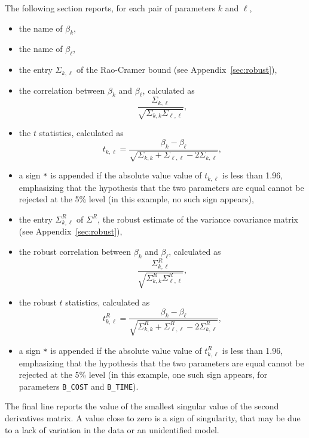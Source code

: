 \documentclass[12pt,a4paper]{article}
\begin{document}
The following section reports, for each pair of parameters $k$ and
$\ell$,
\begin{itemize}
\item the name of $\beta_k$,
\item the name of $\beta_\ell$,
\item the entry $\Sigma_{k,\ell}$ of the 
         Rao-Cramer bound (see Appendix~\ref{sec:robust}),
\item the correlation between $\beta_k$ and $\beta_\ell$, calculated as
\begin{equation}
\frac{\Sigma_{k,\ell}}{\sqrt{\Sigma_{k,k}\Sigma_{\ell,\ell}}},
\end{equation}
\item the $t$ statistics, calculated as
\begin{equation}
t_{k,\ell}= \frac{\beta_k - \beta_\ell}{\sqrt{\Sigma_{k,k} + \Sigma_{\ell,\ell} - 2 \Sigma_{k,\ell}}},
\end{equation}
  \item  a sign \lstinline$*$ is
         appended if the absolute value value of $t_{k,\ell}$ is less than
         1.96, emphasizing that the hypothesis that the two parameters
         are equal cannot be rejected at the 5\% level (in this example, no such sign appears), 
\item the entry $\Sigma^R_{k,\ell}$ of $\Sigma^R$, the robust estimate of the variance covariance matrix (see Appendix~\ref{sec:robust}),
\item the robust correlation between $\beta_k$ and $\beta_\ell$, calculated as
\begin{equation}
\frac{\Sigma^R_{k,\ell}}{\sqrt{\Sigma^R_{k,k}\Sigma^R_{\ell,\ell}}},
\end{equation}
\item the robust $t$ statistics, calculated as
\begin{equation}
t^R_{k,\ell}=\frac{\beta_k - \beta_\ell}{\sqrt{\Sigma^R_{k,k} + \Sigma^R_{\ell,\ell}
    - 2 \Sigma^R_{k,\ell}}},
\end{equation}
  \item  a sign \lstinline$*$ is
         appended if the absolute value value of $t^R_{k,\ell}$ is less than
         1.96, emphasizing that the hypothesis that the two parameters
         are equal cannot be rejected at the 5\% level (in this
         example, one such sign appears, for parameters
         \lstinline$B_COST$ and \lstinline$B_TIME$). 
\end{itemize}
The final line reports the value of the smallest singular value of the
second derivatives matrix. A value close to zero is a sign of
singularity, that may be due to a lack of variation in the data or
an unidentified model.
\end{document}
